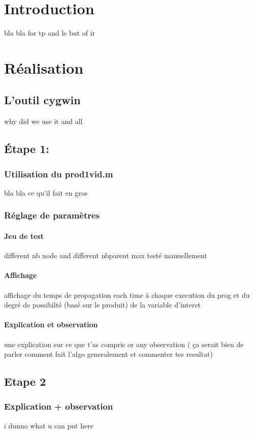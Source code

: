 \documentclass[12pt,a4paper,oneside]{book}
\begin{document}
	\tableofcontents

	\listoffigures

	
	\chapter{Introduction }
	bla bla for tp and le but of ir
	\chapter{Réalisation}
	\section{L'outil cygwin}
	  why did we use it and all
	\section{Étape 1:}
	\subsection{Utilisation du prod1vid.m}
	bla bla ce qu'il fait en gros
	\subsection{Réglage de paramètres}
	\subsubsection{Jeu de test}
	different nb node and  different nbparent max testé manuellement
	\subsubsection{Affichage}
	affichage du temps de propagation each time à chaque execution du prog et du degré de possibilté (basé sur le produit) de la variable d'interet 
	\subsubsection{Explication et observation}
	une explication  sur ce que t'as compris or any observation ( ça serait bien de parler comment fait l'algo generalement et commenter tes resultat)
	
	\section{Etape 2}
	\subsection{Explication + observation }
       i dunno what u can put here
       
\end{document}
